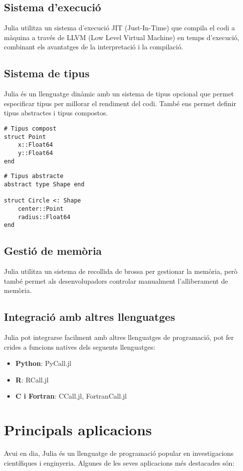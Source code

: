\documentclass[a4paper]{article}
\begin{document}
\subsection{Sistema d'execució}
Julia utilitza un sistema d'execució JIT (Just-In-Time) que compila el codi a màquina a través de LLVM (Low Level Virtual Machine) en temps d'execució, combinant els avantatges de la interpretació i la compilació.

\subsection{Sistema de tipus}
Julia és un llenguatge dinàmic amb un sistema de tipus opcional que permet especificar tipus per millorar el rendiment del codi.
També ens permet definir tipus abstractes i tipus compostos.
\begin{verbatim}
# Tipus compost
struct Point
    x::Float64
    y::Float64
end
\end{verbatim}

\begin{verbatim}
# Tipus abstracte
abstract type Shape end

struct Circle <: Shape
    center::Point
    radius::Float64
end
\end{verbatim}

\newpage

\subsection{Gestió de memòria}
Julia utilitza un sistema de recollida de brossa per gestionar la memòria, però també permet als desenvolupadors controlar manualment l'alliberament de memòria.
\subsection{Integració amb altres llenguatges}
Julia pot integrarse facilment amb altres llenguatges de programació, pot fer crides a funcions natives dels seguents llenguatges:
\begin{itemize}
    \item \textbf{Python}: PyCall.jl
    \item \textbf{R}: RCall.jl
    \item \textbf{C i Fortran}: CCall.jl, FortranCall.jl
\end{itemize}

\section{Principals aplicacions}
Avui en dia, Julia és un llenguatge de programació popular en investigacions científiques i enginyeria. Algunes de les seves aplicacions més destacades són:
\end{document}

